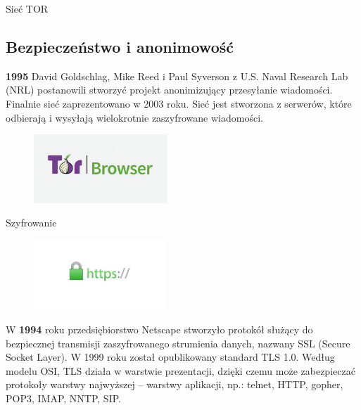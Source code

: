 \documentclass{beamer}
\begin{document}
	\begin{frame}{Sieć TOR}
		\subsection{Bezpieczeństwo i anonimowość}
		\textbf{1995} David Goldschlag, Mike Reed i Paul Syverson z U.S. Naval Research Lab (NRL) postanowili stworzyć projekt anonimizujący przesyłanie wiadomości. Finalnie sieć zaprezentowano w 2003 roku. Sieć jest stworzona z serwerów, które odbierają i wysyłają wielokrotnie zaszyfrowane wiadomości. \cite{tor}
		\begin{figure}
			\includegraphics[width=5cm]{tor-browser_0_43_23_0.png}
		\end{figure}
	\end{frame}
	\begin{frame}{Szyfrowanie}
		\begin{figure}
			\includegraphics[width=5cm]{ssl.jpg}
		\end{figure}
		W \textbf{1994} roku przedsiębiorstwo Netscape stworzyło protokół służący do bezpiecznej transmisji zaszyfrowanego strumienia danych, nazwany SSL (Secure Socket Layer). W 1999 roku został opublikowany standard TLS 1.0. Według modelu OSI, TLS działa w warstwie prezentacji, dzięki czemu może zabezpieczać protokoły warstwy najwyższej – warstwy aplikacji, np.: telnet, HTTP, gopher, POP3, IMAP, NNTP, SIP.
	\end{frame}
\end{document}
